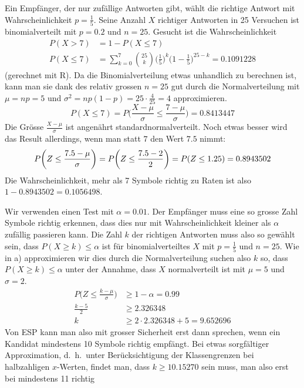 \begin{loesung}
\begin{teilaufgaben}
\item Ein Empfänger, der nur zufällige Antworten gibt, wählt
die richtige Antwort mit Wahrscheinlichkeit $p=\frac15$.
Seine Anzahl $X$ richtiger Antworten in 25 Versuchen ist binomialverteilt mit
$p=0.2$ und $n=25$. Gesucht ist die Wahrscheinlichkeit
\begin{align*}
P(X > 7)&= 1 - P(X\le 7)\\
P(X\le 7)&=\sum_{k=0}^7\binom{25}{k}
\biggl(\frac15\biggr)^k
\biggl(1-\frac15\biggr)^{25-k}
 = 0.1091228
\end{align*}
(gerechnet mit R).
Da die Binomialverteilung etwas unhandlich zu berechnen ist, kann man sie
dank des relativ grossen $n=25$ gut durch die Normalverteilung
mit $\mu=np=5$ und $\sigma^2=np(1-p)=25\cdot\frac{4}{25}=4$
approximieren.
\[
P(X\le 7)=P\biggl(\frac{X-\mu}{\sigma}\le \frac{7-\mu}{\sigma}\biggr)
=
0.8413447
\]
Die Grösse $\frac{X-\mu}{\sigma}$ ist angenährt standardnormalverteilt.
Noch etwas besser wird das Result allerdings, wenn man statt $7$ den
Wert $7.5$ nimmt:
\[
P\biggl(Z\le\frac{7.5-\mu}{\sigma}\biggr)
=
P\biggl(Z\le \frac{7.5-2}{2}\biggr)
=
P(Z\le 1.25)=0.8943502\\
\]
Die Wahrscheinlichkeit, mehr als 7 Symbole richtig zu Raten ist
also $1-0.8943502= 0.1056498$.
\item
Wir verwenden einen Test mit $\alpha=0.01$.
Der Empfänger muss eine so grosse Zahl Symbole richtig erkennen,
dass dies nur mit Wahrscheinlichkeit kleiner als $\alpha$ zufällig
passieren kann.
Die Zahl $k$ der richtigen Antworten muss also so gewählt sein,
dass $P(X\ge k) \le \alpha$ ist für binomialverteiltes $X$ mit $p=\frac15$
und $n=25$. Wie in a) approximieren wir dies durch die Normalverteilung
suchen also $k$ so, dass $P(X\ge k)\le\alpha$ unter der Annahme, dass
$X$ normalverteilt ist mit $\mu=5$ und $\sigma=2$.
\begin{align*}
P\biggl(Z\le \frac{k - \mu}{\sigma}\biggr)&\ge 1-\alpha=0.99\\
\frac{k-5}2&\ge 2.326348\\
k&\ge 2\cdot 2.326348 + 5=9.652696
\end{align*}
Von ESP kann man also mit grosser Sicherheit erst dann sprechen, wenn
ein Kandidat mindestens 10 Symbole richtig empfängt.
Bei etwas sorgfältiger Approximation, d.~h.~unter Berücksichtigung
der Klassengrenzen bei halbzahligen $x$-Werten, findet man, dass
$k\ge 10.15270$ sein muss, man also erst bei mindestens 11 richtig

\end{teilaufgaben}
\end{loesung}
